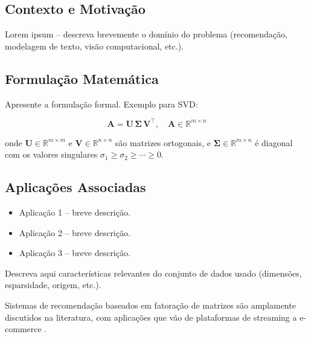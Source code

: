 \documentclass[12pt, a4paper]{article}
\begin{document}

\subsection{Contexto e Motivação}

Lorem ipsum – descreva brevemente o domínio do problema
(recomendação, modelagem de texto, visão computacional, etc.).

\subsection{Formulação Matemática}

Apresente a formulação formal. Exemplo para SVD:

\begin{equation}
  \mathbf{A} = \mathbf{U}\,\boldsymbol{\Sigma}\,\mathbf{V}^\top,
  \quad \mathbf{A} \in \mathbb{R}^{m \times n}
  \label{eq:svd}
\end{equation}

onde $\mathbf{U} \in \mathbb{R}^{m \times m}$ e $\mathbf{V} \in \mathbb{R}^{n \times n}$
são matrizes ortogonais, e $\boldsymbol{\Sigma} \in \mathbb{R}^{m \times n}$
é diagonal com os valores singulares $\sigma_1 \geq \sigma_2 \geq \cdots \geq 0$.

\subsection{Aplicações Associadas}

\begin{itemize}
  \item Aplicação 1 – breve descrição.
  \item Aplicação 2 – breve descrição.
  \item Aplicação 3 – breve descrição.
\end{itemize}

\begin{destaque}
  Descreva aqui características relevantes do conjunto de dados usado
  (dimensões, esparsidade, origem, etc.).
\end{destaque}

Sistemas de recomendação baseados em fatoração de matrizes são amplamente
discutidos na literatura, com aplicações que vão de plataformas de streaming
a e-commerce \cite{koren2009matrix}.
\end{document}
